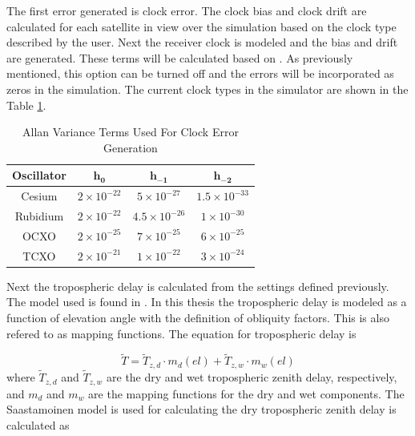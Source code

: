 \documentclass[12pt]{report}
\begin{document}
The first error generated is clock error. The clock bias and clock drift are calculated for each satellite in view over the simulation based on the clock type described by the user. Next the receiver clock is modeled and the bias and drift are generated. These terms will be calculated based on \cite{brown_introduction_2012}. As previously mentioned, this option can be turned off and the errors will be incorporated as zeros in the simulation. The current clock types in the simulator are shown in the Table \ref{table:ClockTypes}. 

\begin{table}
\begin{center}
\begin{tabular}{|c c c c|}
    \hline
    Oscillator &  $\mathbf{h_0}$ & $\mathbf{h_{-1}} $ & $\mathbf{h_{-2}}$\\
    \hline\hline
    Cesium & $2 \times 10^{-22}$ & $5 \times 10^{-27}$ & $1.5 \times 10^{-33}$ \\
    \hline
    Rubidium & $2 \times 10^{-22}$ & $4.5 \times 10^{-26}$ & $1 \times 10^{-30}$\\
    \hline
    OCXO & $2 \times 10^{-25}$ & $7 \times 10^{-25}$ & $6 \times 10^{-25}$\\
    \hline
    TCXO & $2 \times 10^{-21}$ & $1 \times 10^{-22}$ & $3 \times 10^{-24}$\\
    \hline
\end{tabular}
\caption{Allan Variance Terms Used For Clock Error Generation}
\label{table:ClockTypes}
\end{center}
\end{table}

Next the tropospheric delay is calculated from the settings defined previously. The model used is found in \cite{misraGlobalPositioningSystem2012}. In this thesis the tropospheric delay is modeled as a function of elevation angle with the definition of obliquity factors. This is also refered to as mapping functions. The equation for tropospheric delay is 

\begin{equation}
    \tilde{T} = \tilde{T}_{z,d} \cdot m_d(el) + \tilde{T}_{z,w} \cdot m_w(el)
    \label{eqn:TropError}
\end{equation}
where $\tilde{T}_{z,d}$ and $\tilde{T}_{z,w}$ are the dry and wet tropospheric zenith delay, respectively, and $m_d$ and $m_w$ are the mapping functions for the dry and wet components. The Saastamoinen model is used for calculating the dry tropospheric zenith delay is calculated as
\end{document}
